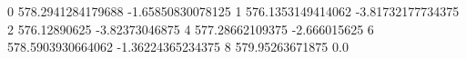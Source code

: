 0 578.2941284179688 -1.65850830078125
1 576.1353149414062 -3.81732177734375
2 576.12890625 -3.82373046875
4 577.28662109375 -2.666015625
6 578.5903930664062 -1.36224365234375
8 579.95263671875 0.0
